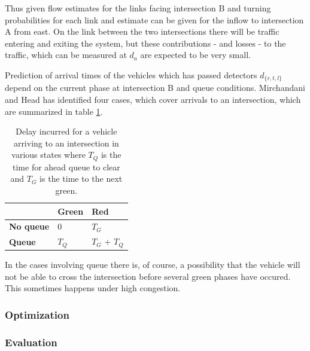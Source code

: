Thus given flow estimates for the links facing intersection B and turning probabilities for each link and estimate can be given for the inflow to intersection A from east. On the link between the two intersections there will be traffic entering and exiting the system, but these contributions - and losses - to the traffic, which can be measured at $d_a$ are expected to be very small.

Prediction of arrival times of the vehicles which has passed detectors $d_{\lbrace r,t,l \rbrace}$ depend on the current phase at intersection B and queue conditions. Mirchandani and Head has identified four cases, which cover arrivals to an intersection, which are summarized in table \ref{tbl:delaycases}.

\begin{table}[!ht]
\begin{center}
\begin{tabular}{l|ll}
 & \textbf{Green} & \textbf{Red} \\ \hline
\textbf{No queue} & 0 & $T_G$ \\
\textbf{Queue} & $T_Q$ & $T_G$ + $T_Q$
\end{tabular}
\end{center}
\caption{Delay incurred for a vehicle arriving to an intersection in various states where $T_Q$ is the time for ahead queue to clear and $T_G$ is the time to the next green.}
\label{tbl:delaycases}
\end{table}

In the cases involving queue there is, of course, a possibility that the vehicle will not be able to cross the intersection before several green phases have occured. This sometimes happens under high congestion.

\subsubsection*{Optimization}

\subsubsection*{Evaluation}
